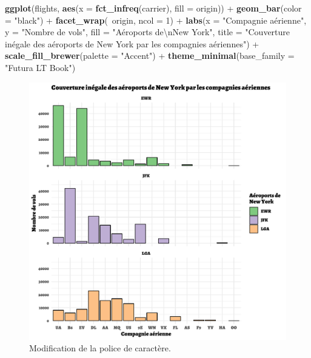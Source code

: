 \documentclass[a4paperpaper,]{article}
\newenvironment{Shaded}{\begin{snugshade}}{\end{snugshade}}
\newcommand{\CharTok}[1]{\textcolor[rgb]{0.57,0.30,0.62}{#1}}
\newcommand{\DataTypeTok}[1]{\textcolor[rgb]{0.00,0.34,0.68}{#1}}
\newcommand{\DecValTok}[1]{\textcolor[rgb]{0.69,0.50,0.00}{#1}}
\newcommand{\KeywordTok}[1]{\textcolor[rgb]{0.12,0.11,0.11}{\textbf{#1}}}
\newcommand{\NormalTok}[1]{\textcolor[rgb]{0.12,0.11,0.11}{#1}}
\newcommand{\OperatorTok}[1]{\textcolor[rgb]{0.12,0.11,0.11}{#1}}
\newcommand{\StringTok}[1]{\textcolor[rgb]{0.75,0.01,0.01}{#1}}
\theoremstyle{definition}
\theoremstyle{definition}
\theoremstyle{definition}
\theoremstyle{remark}
\begin{document}
\begin{Shaded}
\begin{Highlighting}[]
\KeywordTok{ggplot}\NormalTok{(flights, }\KeywordTok{aes}\NormalTok{(}\DataTypeTok{x =} \KeywordTok{fct_infreq}\NormalTok{(carrier), }\DataTypeTok{fill =}\NormalTok{ origin)) }\OperatorTok{+}
\StringTok{  }\KeywordTok{geom_bar}\NormalTok{(}\DataTypeTok{color =} \StringTok{"black"}\NormalTok{) }\OperatorTok{+}
\StringTok{  }\KeywordTok{facet_wrap}\NormalTok{(}\OperatorTok{~}\NormalTok{origin, }\DataTypeTok{ncol =} \DecValTok{1}\NormalTok{) }\OperatorTok{+}
\StringTok{  }\KeywordTok{labs}\NormalTok{(}\DataTypeTok{x =} \StringTok{"Compagnie aérienne"}\NormalTok{,}
       \DataTypeTok{y =} \StringTok{"Nombre de vols"}\NormalTok{,}
       \DataTypeTok{fill =} \StringTok{"Aéroports de}\CharTok{\textbackslash{}n}\StringTok{New York"}\NormalTok{,}
       \DataTypeTok{title =} \StringTok{"Couverture inégale des aéroports de New York par les compagnies aériennes"}\NormalTok{) }\OperatorTok{+}
\StringTok{  }\KeywordTok{scale_fill_brewer}\NormalTok{(}\DataTypeTok{palette =} \StringTok{"Accent"}\NormalTok{) }\OperatorTok{+}
\StringTok{  }\KeywordTok{theme_minimal}\NormalTok{(}\DataTypeTok{base_family =} \StringTok{"Futura LT Book"}\NormalTok{)}
\end{Highlighting}
\end{Shaded}

\begin{figure}[htpb]

{\centering \includegraphics[width=0.9\linewidth]{figure/themefont-1} 

}

\caption{Modification de la police de caractère.}\label{fig:themefont}
\end{figure}
\end{document}
